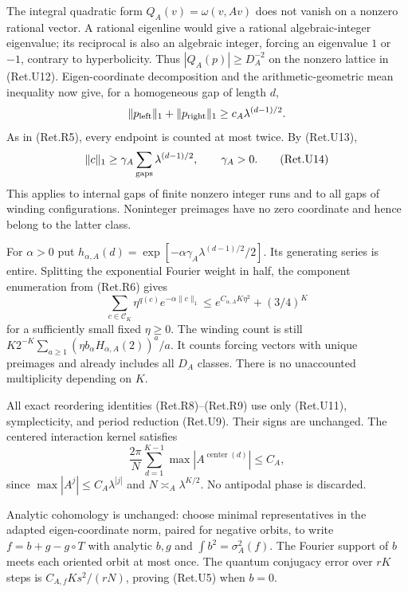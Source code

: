 The integral quadratic form \(Q_A(v)=\omega(v,Av)\) does not vanish
on a nonzero rational vector. A rational eigenline would give a
rational algebraic-integer eigenvalue; its reciprocal is also an
algebraic integer, forcing an eigenvalue \(1\) or \(-1\), contrary to
hyperbolicity. Thus \(|Q_A(p)|\ge D_A^{-2}\) on the nonzero lattice
in (Ret.U12). Eigen-coordinate decomposition and the arithmetic-geometric
mean inequality now give, for a homogeneous gap of length \(d\),
\[
       \|p_{\rm left}\|_1+\|p_{\rm right}\|_1
                              \ge c_A\lambda^{(d-1)/2}.
\]
As in (Ret.R5), every endpoint is counted at most twice. By (Ret.U13),
\[
          \|c\|_1\ge \gamma_A
                       \sum_{\rm gaps}\lambda^{(d-1)/2},
                        \qquad\gamma_A>0.                \tag{Ret.U14}
\]
This applies to internal gaps of finite nonzero integer runs and
to all gaps of winding configurations. Noninteger preimages have
no zero coordinate and hence belong to the latter class.

For \(\alpha>0\) put
\(h_{\alpha,A}(d)=\exp[-\alpha\gamma_A\lambda^{(d-1)/2}/2]\).
Its generating series is entire. Splitting the exponential Fourier
weight in half, the component enumeration from (Ret.R6) gives
\[
 \sum_{c\in\mathcal C_K}\eta^{q(c)}e^{-\alpha\|c\|_1}
                   \le e^{C_{\alpha,A}K\eta^2}+(3/4)^K   \tag{Ret.U15}
\]
for a sufficiently small fixed \(\eta\ge0\).
The winding count is still
\(K2^{-K}\sum_{a\ge1}(\eta b_\alpha H_{\alpha,A}(2))^a/a\).
It counts forcing vectors with unique preimages and already includes
all \(D_A\) classes. There is no unaccounted multiplicity depending on \(K\).

All exact reordering identities (Ret.R8)--(Ret.R9) use only (Ret.U11),
symplecticity, and period reduction (Ret.U9). Their signs are unchanged.
The centered interaction kernel satisfies
\[
 \frac{2\pi}{N}\sum_{d=1}^{K-1}
                \max|A^{\operatorname{center}(d)}|
                                  \le C_A,               \tag{Ret.U16}
\]
since \(\max|A^j|\le C_A\lambda^{|j|}\) and
\(N\asymp_A\lambda^{K/2}\). No antipodal phase is discarded.

Analytic cohomology is unchanged: choose minimal representatives
in the adapted eigen-coordinate norm, paired for negative orbits,
to write \(f=b+g-g\circ T\) with analytic \(b,g\) and
\(\int b^2=\sigma_A^2(f)\). The Fourier support of \(b\) meets each
oriented orbit at most once. The quantum conjugacy error over \(rK\)
steps is \(C_{A,f}Ks^2/(rN)\), proving (Ret.U5) when \(b=0\).


